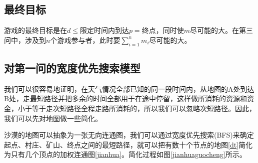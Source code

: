 \documentclass[withoutpreface,bwprint]{cumcmthesis} %
\begin{document}
\subsection{最终目标}

游戏的最终目标是在\(d\leq\)限定时间内到达\(p=\)终点，同时使\(m\)尽可能的大。在第三问中，涉及到\(n\)个游戏参与者，此时要\(\sum_{i=1}^n m_i\)尽可能的大。

\subsection{对第一问的宽度优先搜索模型}

我们可以很容易地证明，在天气情况全部已知的同一段时间内，从地图的A处到达B处，走最短路径并把多余的时间全部用于在途中停留，这样做所消耗的资源和资金，小于等于走次短路径全程走路所消耗的，所以我们可以忽略次短路径。因此，我们可以先对地图做一些简化。

沙漠的地图可以抽象为一张无向连通图，我们可以通过宽度优先搜索(BFS)来确定起点、村庄、矿山、终点之间的最短路径，就可以把有数十个节点的地图\ref{dt}简化为只有几个顶点的加权连通图\ref{jianhua}。简化过程如图\ref{jianhuaguocheng}所示。
\end{document}
